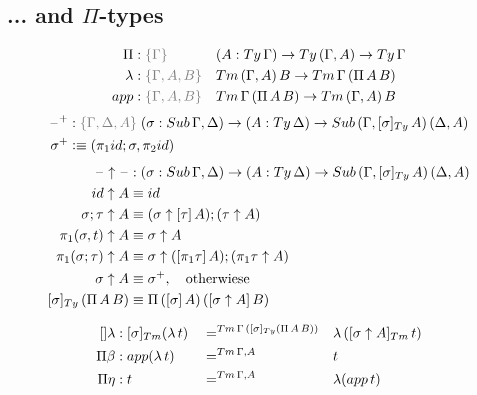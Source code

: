 \documentclass[a4paper,UKenglish,numberwithinsect,cleveref,thm-restate]{lipics-v2021}
\begin{document}
\subsection{... and \texorpdfstring{$\Pi$}{Π}-types} \label{subsec:SC+U+Pi}
\begin{alignat*}{3}
  \Pi     &: \implicit{\Gamma}            && (A : \Ty\,\Gamma) \to \Ty\,(\Gamma, A) \to \Ty\,\Gamma \\
  \lambda &: \implicit{\Gamma, A, B}      && \Tm\,(\Gamma, A)\,B \to \Tm\,\Gamma\,(\Pi\,A\,B) \\
  \mathsf{app} &: \implicit{\Gamma, A, B} && \Tm\,\Gamma\,(\Pi\,A\,B) \to \Tm\,(\Gamma, A)\,B \\
\end{alignat*}
\begin{alignat*}{3}
  \blank^+ & : \implicit{\Gamma, \Delta, A}\; (\sigma : \Sub\,\Gamma,\Delta) \to (A : \Ty\,\Delta) \to \Sub\,(\Gamma, [\sigma]_{\Ty}\,A)\, (\Delta, A) \\
  \sigma^+ & \defeq (\pi_1\idS ; \sigma, \pi_2\idS) \\
\end{alignat*}
\begin{alignat*}{3}
  \blank\uparrow \blank & : (\sigma : \Sub\,\Gamma,\Delta) \to (A : \Ty\,\Delta) \to \Sub\,(\Gamma, [\sigma]_{\Ty}\,A)\, (\Delta, A) \\
\idS                \uparrow A & \jdeq \idS \\
\sigma ; \tau       \uparrow A & \jdeq (\sigma \uparrow \sub{\tau}{A} ) ; (\tau \uparrow A) \\
\pi_1(\sigma, t)    \uparrow A & \jdeq \sigma \uparrow A \\
\pi_1(\sigma; \tau) \uparrow A & \jdeq \sigma \uparrow (\sub{\pi_1 \tau}{A}) ; (\pi_1 \tau \uparrow A) \\
\sigma              \uparrow A & \jdeq \sigma^+ , \quad \text{otherwiese} \\
  [ \sigma ]_{\Ty}\,(\Pi\,A\,B) & \jdeq \Pi\,(\sub{\sigma}{A})\,(\sub{\sigma\uparrow A}{B})
\end{alignat*}

\begin{alignat*}{3}
  \mathsf{[]\lambda} & : [\sigma]_{\Tm} (\lambda\,t) && =^{\Tm\,\Gamma\,([\sigma]_{\Ty}(\Pi\,A\,B))} && \lambda\,([\sigma \uparrow A]_{\Tm}\,t) \\
  \Pi\beta & : \mathsf{app}(\lambda\,t) && =^{\Tm\,\Gamma,A} {} && t \\
  \Pi\eta & :  t && =^{\Tm\,\Gamma,A} {} && \lambda(\mathsf{app}\,t)
\end{alignat*}
\end{document}
